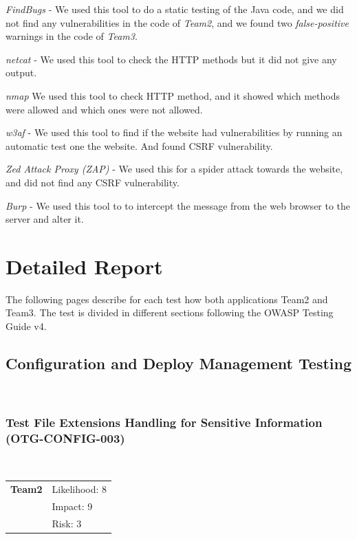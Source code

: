 \documentclass[headsepline,footsepline,footinclude=false,oneside,fontsize=11pt,paper=a4,listof=totoc,bibliography=totoc]{scrbook} %
\begin{document}
\textit{FindBugs} - We used this tool to do a static testing of the Java code, and we did not find any vulnerabilities in the code of \textit{Team2}, and we found two \textit{false-positive} warnings in the code of \textit{Team3}.\

\textit{netcat} - We used this tool to check the HTTP methods but it did not give any output. \

\textit{nmap} We used this tool to check HTTP method, and it showed which methods were allowed and which ones were not allowed.

\textit{w3af} - We used this tool to find if the website had vulnerabilities by running an automatic test one the website. And found CSRF vulnerability. \

\textit{Zed Attack Proxy (ZAP)} - We used this for a spider attack towards the website, and did not find any CSRF vulnerability.\

\textit{Burp} - We used this tool to to intercept the message from the web browser to the server and alter it.\

\chapter{Detailed Report}

The following pages describe for each test how both applications Team2 and Team3. The test is divided in different sections following the OWASP Testing Guide v4.

\pagebreak


\section{Configuration and Deploy Management Testing}\
\subsection{Test File Extensions Handling for Sensitive Information (OTG-CONFIG-003)}\

\begin{tabular}{cR{12cm}}
	\textbf{Team2} & Likelihood: 8\\& Impact: 9\\& Risk: 3
\end{tabular}
\end{document}
